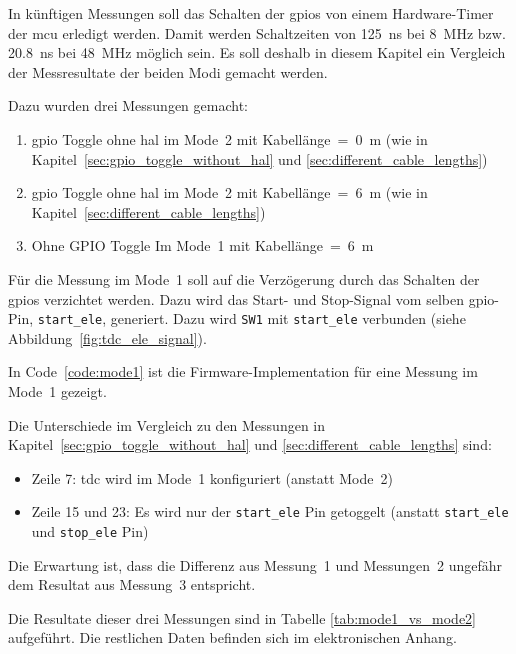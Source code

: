 In künftigen Messungen soll das Schalten der \acrshort{gpio}s von einem Hardware-Timer der \acrshort{mcu} erledigt
werden. Damit werden Schaltzeiten von 125~ns bei 8~MHz bzw. 20.8~ns bei 48~MHz möglich sein. Es soll deshalb in diesem
Kapitel ein Vergleich der Messresultate der beiden Modi gemacht werden.

Dazu wurden drei Messungen gemacht:
\begin{enumerate}
    \item \acrshort{gpio} Toggle ohne \acrshort{hal} im Mode~2 mit Kabellänge~=~0~m (wie in Kapitel~\ref{sec:gpio_toggle_without_hal} und \ref{sec:different_cable_lengths})
    \item \acrshort{gpio} Toggle ohne \acrshort{hal} im Mode~2 mit Kabellänge~=~6~m (wie in Kapitel~\ref{sec:different_cable_lengths})
    \item Ohne GPIO Toggle Im Mode~1 mit Kabellänge~=~6~m
\end{enumerate}

Für die Messung im Mode~1 soll auf die Verzögerung durch das Schalten der \acrshort{gpio}s verzichtet werden. Dazu wird
das Start- und Stop-Signal vom selben \acrshort{gpio}-Pin, \lstinline|start_ele|, generiert. Dazu wird \lstinline|SW1|
mit \lstinline|start_ele| verbunden (siehe Abbildung~\ref{fig:tdc_ele_signal}).

In Code~\ref{code:mode1} ist die Firmware-Implementation für eine Messung im Mode~1 gezeigt.



Die Unterschiede im Vergleich zu den Messungen in Kapitel~\ref{sec:gpio_toggle_without_hal} und
\ref{sec:different_cable_lengths} sind:

\begin{itemize}
    \item Zeile 7: \acrshort{tdc} wird im Mode~1 konfiguriert (anstatt Mode~2)
    \item Zeile 15 und 23: Es wird nur der \lstinline|start_ele| Pin getoggelt (anstatt \lstinline|start_ele| und \lstinline|stop_ele| Pin)
\end{itemize}

Die Erwartung ist, dass die Differenz aus Messung~1 und Messungen~2 ungefähr dem Resultat aus Messung~3 entspricht.

Die Resultate dieser drei Messungen sind in Tabelle \ref{tab:mode1_vs_mode2} aufgeführt. Die restlichen Daten befinden
sich im elektronischen Anhang.

